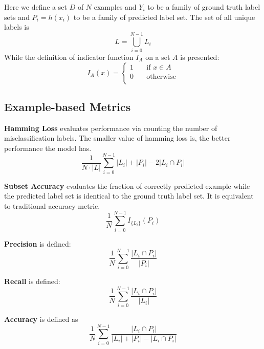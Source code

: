 Here we define a set $D$ of $N$ examples and $Y_{i}$ to be a family of ground truth label sets and $P_{i} = h(x_{i})$ to be a family of predicted label set. The set of all unique labels is
\begin{equation}\label{eq:UniLabel}
L = \bigcup_{i=0}^{N-1} L_{i}
\end{equation}
While the definition of indicator function $I_{A}$ on a set $A$ is presented:
\begin{equation}\label{eq:IndicatorFunc}
I_{A}(x) =
  \begin{cases}
    1       & \quad \text{if } x \in A\\
    0  & \quad \text{otherwise}\\
  \end{cases}
\end{equation}

\subsection{Example-based Metrics}

\textbf{Hamming Loss} evaluates performance via counting the number of misclassification labels. The smaller value of hamming loss is, the better performance the model has.
\begin{equation}\label{eq:HammingLoss}
\frac{1}{N \cdot \left|L\right|} \sum_{i=0}^{N - 1} \left|L_i\right| + \left|P_i\right| - 2\left|L_i
          \cap P_i\right|
\end{equation}

\textbf{Subset Accuracy} evaluates the fraction of correctly predicted example while the predicted label set is identical to the ground truth label set. It is equivalent to traditional accuracy metric.
\begin{equation}\label{eq:SubsetAcu}
\frac{1}{N} \sum_{i=0}^{N-1} I_{\{L_i\}}(P_i)
\end{equation}

\textbf{Precision} is defined:
\begin{equation}\label{eq:Precision}
\frac{1}{N} \sum_{i=0}^{N-1} \frac{\left|L_i \cap P_i\right|}{\left|P_i\right|}
\end{equation}

\textbf{Recall} is defined:
\begin{equation}\label{eq:Recall}
\frac{1}{N} \sum_{i=0}^{N-1} \frac{\left|L_i \cap P_i\right|}{\left|L_i\right|}
\end{equation}

\textbf{Accuracy} is defined as
\begin{equation}\label{eq:Accuracy}
\frac{1}{N} \sum_{i=0}^{N - 1} \frac{\left|L_i \cap P_i \right|}
        {\left|L_i\right| + \left|P_i\right| - \left|L_i \cap P_i \right|}
\end{equation}

